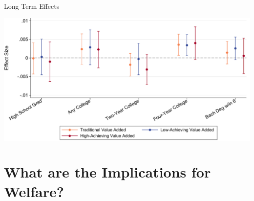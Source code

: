 \documentclass[t,aspectratio=169,11pt]{beamer}
\begin{document}

\begin{frame}[c]{Long Term Effects}
\begin{center}



\includegraphics[width=.85\textwidth]{Working_Paper/WP_Figures/fig2b_longterm.pdf}
\end{center}

\end{frame}





\section{What are the Implications for Welfare?}


\end{document}

